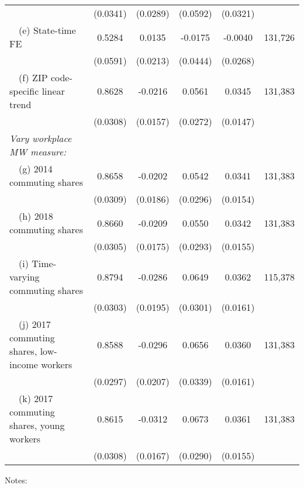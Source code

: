 \begin{table}
\begin{tabular}{@{}lccccc@{}}
                                                             & (0.0341) & (0.0289) & (0.0592) & (0.0321) &      \\
        $\quad$(e) State-time FE                             &  0.5284  &  0.0135  &  -0.0175  &  -0.0040  & 131,726 \\
                                                             & (0.0591) & (0.0213) & (0.0444) & (0.0268) &      \\
        $\quad$(f) ZIP code-specific linear trend            &  0.8628  &  -0.0216  &  0.0561  &  0.0345  & 131,383 \\
                                                             & (0.0308) & (0.0157) & (0.0272) & (0.0147) &      \\
        \textit{Vary workplace MW measure:}                  &       &       &       &       &      \\
        $\quad$(g) 2014 commuting shares                     &  0.8658  &  -0.0202  &  0.0542  &  0.0341  & 131,383 \\
                                                             & (0.0309) & (0.0186) & (0.0296) & (0.0154) &      \\
        $\quad$(h) 2018 commuting shares                     &  0.8660  &  -0.0209  &  0.0550  &  0.0342  & 131,383 \\
                                                             & (0.0305) & (0.0175) & (0.0293) & (0.0155) &      \\
        $\quad$(i) Time-varying commuting shares             &  0.8794  &  -0.0286  &  0.0649  &  0.0362  & 115,378 \\
                                                             & (0.0303) & (0.0195) & (0.0301) & (0.0161) &      \\
        $\quad$(j) 2017 commuting shares, low-income workers &  0.8588  &  -0.0296  &  0.0656  &  0.0360  & 131,383 \\
                                                             & (0.0297) & (0.0207) & (0.0339) & (0.0161) &      \\
        $\quad$(k) 2017 commuting shares, young workers      &  0.8615  &  -0.0312  &  0.0673  &  0.0361  & 131,383 \\
                                                             & (0.0308) & (0.0167) & (0.0290) & (0.0155) &      \\ \bottomrule
    \end{tabular}

    \begin{minipage}{.95\textwidth} \footnotesize
        \vspace{2mm}
        Notes: 
        
    \end{minipage}
\end{table}
